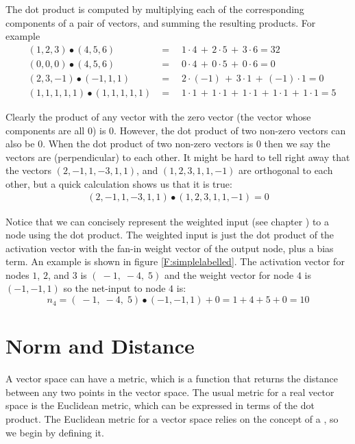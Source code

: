   The dot product is computed by multiplying each of the corresponding 
components of a pair of vectors, and summing the resulting products. For 
example
\begin{eqnarray*}
&(1,2,3)  \bullet  (4,5,6)& = \quad 1 \cdot 4 \,+\, 2 \cdot 5 \,+\, 3 \cdot 6 
= 32 \\
&(0,0,0)  \bullet  (4,5,6)& = \quad 0 \cdot 4 \,+\, 0 \cdot 5 \,+\, 0 \cdot 6 
= 0  \\
&(2,3,-1) \bullet (-1,1,1)& = \quad 2 \cdot (-1) \,+\, 3 \cdot 1 \,+\, (-1) 
\cdot 1 = 0 \\
&(1,1,1,1,1) \bullet (1,1,1,1,1)& = \quad  
 1 \cdot 1 \,+\, 1 \cdot 1 \,+\,  1 \cdot 1 \,+\, 1 \cdot 1 \,+\, 1 \cdot 1 = 5
\end{eqnarray*}

   Clearly the product of any vector with the zero vector (the vector whose
components are all $0$) is $0$. However, the dot product of two non-zero 
vectors can also be $0$. When the dot product of two non-zero vectors is $0$ 
then we say the vectors are  (perpendicular) to each 
other. It might be hard to tell right away that the vectors $(2,-1,1,-3,1,1)$,
and $(1,2,3,1,1,-1)$ are orthogonal to each other, but a quick calculation 
shows us that it is true:
\begin{eqnarray*}
           (2,-1,1,-3,1,1) \bullet (1,2,3,1,1,-1) = 0
\end{eqnarray*}

   Notice that we can concisely represent the weighted input (see chapter 
) to a node using the dot product. The weighted input 
is just the dot product of the activation vector with the fan-in weight vector 
of the output node, plus a bias term. An example is shown in figure 
\ref{F:simplelabelled}. The activation vector for nodes $1$, $2$, and $3$ is 
$(\; -1,\; -4,\; 5)$ and the weight vector for node $4$ is $(-1,-1,1)$ so the 
net-input to node $4$ is:
\begin{equation*}
n_4 = (\; -1,\; -4,\; 5) \bullet (-1,-1,1) + 0  = 1 + 4 + 5 + 0 = 10
\end{equation*}
 
\section{Norm and Distance}\label{metricSpace}

   A vector space can have a metric, which is a function that returns the 
distance between any two points in the vector space. The usual metric for a 
real vector space is the Euclidean metric, which can be expressed in terms of 
the dot product. The Euclidean metric for a vector space relies on the concept of a , so we begin by defining it.

